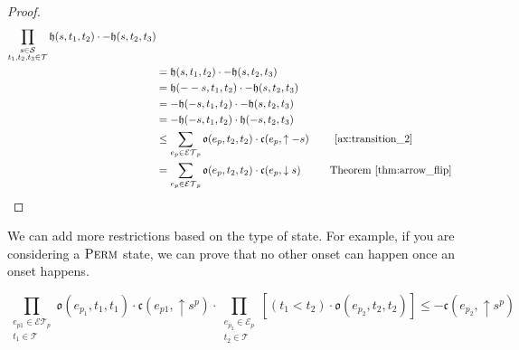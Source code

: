 \begin{proof}
	\begin{align*}
		\prod_{\substack{s \in \mathcal{S}                                                                                                                                    \\ t_1, t_2, t_3 \in \mathcal{T}}}\mathfrak{h}(s, t_1, t_2) \cdot - \mathfrak{h}(s, t_2, t_3)   \\
		 & =\mathfrak{h}(s, t_1, t_2) \cdot - \mathfrak{h}(s, t_2, t_3)                                                                                                       \\
		 & = \mathfrak{h}(-- s, t_1, t_2) \cdot - \mathfrak{h}(s, t_2, t_3)                                                                                                   \\
		 & = - \mathfrak{h}(- s, t_1, t_2) \cdot - \mathfrak{h}(s, t_2, t_3)                                                                                                  \\
		 & = - \mathfrak{h}(-s, t_1, t_2)   \cdot \mathfrak{h}(-s, t_2, t_3)                                                                                                  \\
		 & \leq \sum_{e_p \in \mathcal{ET}_p} \mathfrak{o}(e_p, t_2, t_2) \cdot \mathfrak{c}(e_p, \uparrow - s) \hspace{0.06 \linewidth} \text{~\ref{ax:transition_2}}        \\
		 & = \sum_{e_p \in \mathcal{ET}_p}\mathfrak{o}(e_p, t_2, t_2) \cdot \mathfrak{c}(e_p, \downarrow s) \hspace{0.06 \linewidth}  \ \ \text{Theorem~\ref{thm:arrow_flip}}
	\end{align*}
\end{proof}

We can add more restrictions based on the type of state. For example, if you are considering
a $\textsc{Perm}$ state, we can prove that no other onset can happen once an onset happens.

\begin{theorem}
	\begin{equation}
		\prod_{\substack{e_{p1} \in \mathcal{ET}_p \\ t_1 \in \mathcal{T}}} \mathfrak{o}(e_{p_1}, t_1, t_1) \cdot \mathfrak{c}(e_{p1}, \uparrow s^{p}) \cdot
		\prod_{\substack{e_{p_2} \in \mathcal{E}_p \\ t_2 \in \mathcal{T}}}[(t_1 < t_2) \cdot \mathfrak{o}(e_{p_2}, t_2, t_2) ]
		\leq - \mathfrak{c}(e_{p_2}, \uparrow s^{p})
	\end{equation}
\end{theorem}

